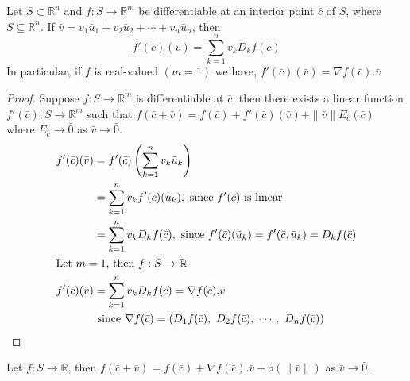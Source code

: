 \begin{theorem}
Let $S \subset \mathbb{R}^n$ and $f : S \to \mathbb{R}^m$ be differentiable at an interior point $\bar{c}$ of $S$, where $S \subseteq \mathbb{R}^n$.
If $\bar{v} = v_1\bar{u}_1+v_2\bar{u}_2 + \cdots + v_n\bar{u}_n$, then
\[ f'(\bar{c})(\bar{v}) = \sum_{k=1}^n v_k D_k f(\bar{c}) \]
In particular, if $f$ is real-valued $(m = 1)$ we have, $f'(\bar{c})(\bar{v}) = \nabla{}f(\bar{c}).\bar{v}$
\end{theorem}
\begin{proof}
Suppose $f : S \to \mathbb{R}^m$ is differentiable at $\bar{c}$, then there exists a linear function $f'(\bar{c}) : S \to \mathbb{R}^m$ such that $f(\bar{c}+\bar{v}) = f(\bar{c}) + f'(\bar{c})(\bar{v}) + \|\bar{v}\| E_{\bar{c}}(\bar{c})$ where $E_{\bar{c}} \to \bar{0}$ as $\bar{v} \to \bar{0}$.
\begin{align*}
	f'(\bar{c})(\bar{v}) & = f'(\bar{c})\left(\sum_{k=1}^n v_k \bar{u}_k\right)\\
	& = \sum_{k=1}^n v_k f'(\bar{c})(\bar{u}_k), \text{ since $f'(\bar{c})$ is linear}\\
	& = \sum_{k=1}^n v_k D_k f(\bar{c}), \text{ since $f'(\bar{c})(\bar{u}_k) = f'(\bar{c},\bar{u}_k) = D_k f(\bar{c})$}\\
	\intertext{Let $m = 1$, then $f : S \to \mathbb{R}$ }
	f'(\bar{c})(\bar{v}) & = \sum_{k=1}^n v_k D_k f(\bar{c}) = \nabla{}f(\bar{c}).\bar{v}\\
	& \text{ since } \nabla{}f(\bar{c}) = \left( D_1f(\bar{c}),\ D_2f(\bar{c}),\ \cdots ,\ D_nf(\bar{c}) \right)
\end{align*}
\end{proof}

\begin{remark}
Let $f : S \to \mathbb{R}$, then $f(\bar{c} +\bar{v}) = f (\bar{c}) + \nabla{}f(\bar{c}).\bar{v} + o(\|\bar{v}\|)$ as $\bar{v} \to \bar{0}$.
\end{remark}

\begin{remark}
\end{remark}

